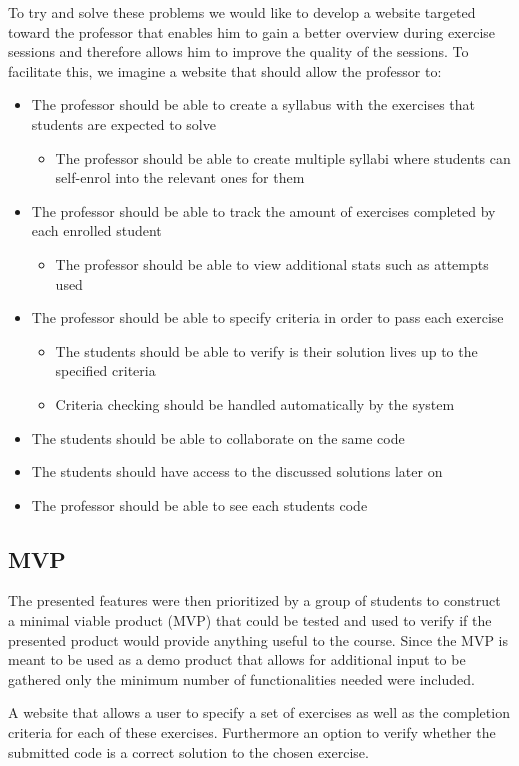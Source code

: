 To try and solve these problems we would like to develop a website targeted toward the professor that enables him to gain a better overview during exercise sessions and therefore allows him to improve the quality of the sessions. To facilitate this, we imagine a website that should allow the professor to:
\begin{itemize}
	\item The professor should be able to create a syllabus with the exercises that students are expected to solve
	\begin{itemize}
		\item The professor should be able to create multiple syllabi where students can self-enrol into the relevant ones for them
	\end{itemize}
	\item The professor should be able to track the amount of exercises completed by each enrolled student
	\begin{itemize}
		\item The professor should be able to view additional stats such as attempts used 
	\end{itemize}
	\item The professor should be able to specify criteria in order to pass each exercise 
	\begin{itemize}
		\item The students should be able to verify is their solution lives up to the specified criteria
		\item Criteria checking should be handled automatically by the system
	\end{itemize}
	\item The students should be able to collaborate on the same code
	\item The students should have access to the discussed solutions later on
	\item The professor should be able to see each students code
\end{itemize}

\subsection{MVP}
The presented features were then prioritized by a group of students to construct a minimal viable product (MVP) that could be tested and used to verify if the presented product would provide anything useful to the course. Since the MVP is meant to be used as a demo product that allows for additional input to be gathered only the minimum number of functionalities needed were included.

\begin{displayquote}
A website that allows a user to specify a set of exercises as well as the completion criteria for each of these exercises. Furthermore an option to verify whether the submitted code is a correct solution to the chosen exercise.
\end{displayquote}





